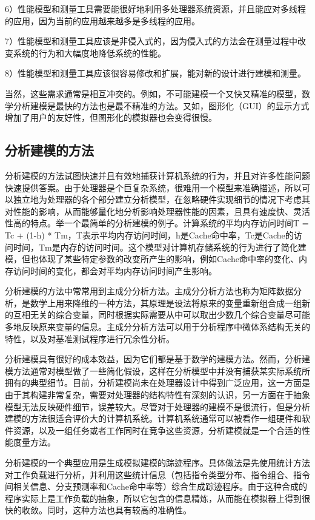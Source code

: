 \documentclass[]{ctexbook}
\begin{document}
6）性能模型和测量工具需要能很好地利用多处理器系统资源，并且能应对多线程的应用，因为当前的应用越来越多是多线程的应用。

7）性能模型和测量工具应该是非侵入式的，因为侵入式的方法会在测量过程中改变系统的行为和大幅度地降低系统的性能。

8）性能模型和测量工具应该很容易修改和扩展，能对新的设计进行建模和测量。

当然，这些需求通常是相互冲突的。例如，不可能建模一个又快又精准的模型，数学分析建模是最快的方法也是最不精准的方法。又如，图形化（GUI）的显示方式增加了用户的友好性，但图形化的模拟器也会变得很慢。

\hypertarget{ux5206ux6790ux5efaux6a21ux7684ux65b9ux6cd5}{%
\subsection{分析建模的方法}\label{ux5206ux6790ux5efaux6a21ux7684ux65b9ux6cd5}}

分析建模的方法试图快速并且有效地捕获计算机系统的行为，并且对许多性能问题快速提供答案。由于处理器是个巨复杂系统，很难用一个模型来准确描述，所以可以独立地为处理器的各个部分建立分析模型，在忽略硬件实现细节的情况下考虑其对性能的影响，从而能够量化地分析影响处理器性能的因素，且具有速度快、灵活性高的特点。举一个最简单的分析建模的例子。计算系统的平均内存访问时间T = Tc + (1-h) * Tm，T表示平均内存访问时间，h是Cache命中率，Tc是Cache的访问时间，Tm是内存的访问时间。这个模型对计算机存储系统的行为进行了简化建模，但也体现了某些特定参数的改变所产生的影响，例如Cache命中率的变化、内存访问时间的变化，都会对平均内存访问时间产生影响。

分析建模的方法中常常用到主成分分析方法。主成分分析方法也称为矩阵数据分析，是数学上用来降维的一种方法，其原理是设法将原来的变量重新组合成一组新的互相无关的综合变量，同时根据实际需要从中可以取出少数几个综合变量尽可能多地反映原来变量的信息。主成分分析方法可以用于分析程序中微体系结构无关的特性，以及对基准测试程序进行冗余性分析。

分析建模具有很好的成本效益，因为它们都是基于数学的建模方法。然而，分析建模方法通常对模型做了一些简化假设，这样在分析模型中并没有捕获某实际系统所拥有的典型细节。目前，分析建模尚未在处理器设计中得到广泛应用，这一方面是由于其构建非常复杂，需要对处理器的结构特性有深刻的认识，另一方面在于抽象模型无法反映硬件细节，误差较大。尽管对于处理器的建模不是很流行，但是分析建模的方法很适合评价大的计算机系统。计算机系统通常可以被看作一组硬件和软件资源，以及一组任务或者工作同时在竞争这些资源，分析建模就是一个合适的性能度量方法。

分析建模的一个典型应用是生成模拟建模的踪迹程序。具体做法是先使用统计方法对工作负载进行分析，并利用这些统计信息（包括指令类型分布、指令组合、指令间相关信息、分支预测率和Cache命中率等）综合生成踪迹程序。由于这种合成的程序实际上是工作负载的抽象，所以它包含的信息精炼，从而能在模拟器上得到很快的收敛。同时，这种方法也具有较高的准确性。
\end{document}
